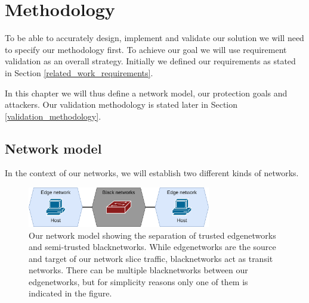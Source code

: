 \chapter{Methodology}
\label{methodology}

To be able to accurately design, implement and validate our solution we will need to specify our methodology first. To achieve our goal we will use requirement validation as an overall strategy. Initially we defined our requirements as stated in Section \ref{related_work_requirements}.

In this chapter we will thus define a network model, our protection goals and attackers. Our validation methodology is stated later in Section \ref{validation_methodology}.


\section{Network model}
In the context of our networks, we will establish two different kinds of networks.

\begin{figure}[ht]
    \centering
    \includegraphics[width=8cm]{images/chapter_4/network_model.png}
    \caption[Network model]{Our network model showing the separation of trusted \gls{edgenetwork}s and semi-trusted \gls{blacknetwork}s. While \gls{edgenetwork}s are the source and target of our network slice traffic, \gls{blacknetwork}s act as transit networks. There can be multiple \gls{blacknetwork}s between our \gls{edgenetwork}s, but for simplicity reasons only one of them is indicated in the figure.}
    \label{fig:network_model}
\end{figure}

